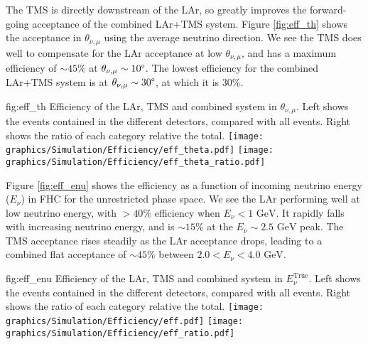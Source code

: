 The TMS is directly downstream of the LAr, so greatly improves the forward-going acceptance of the combined LAr+TMS system. Figure \ref{fig:eff_th} shows the acceptance in $\theta_{\nu,\mu}$ using the average neutrino direction. We see the TMS does well to compensate for the LAr acceptance at low $\theta_{\nu,\mu}$, and has a maximum efficiency of $\sim45\%$ at $\theta_{\nu,\mu}\sim10\degree$. The lowest efficiency for the combined LAr+TMS system is at $\theta_{\nu,\mu}\sim 30\degree$, at which it is 30\%.
\begin{dunefigure}[]{fig:eff_th}
{Efficiency of the LAr, TMS and combined system in $\theta_{\nu,\mu}$. Left shows the events contained in the different detectors, compared with all events. Right shows the ratio of each category relative the total.}
\texttt{[image: graphics/Simulation/Efficiency/eff\_theta.pdf]} \texttt{[image: graphics/Simulation/Efficiency/eff\_theta\_ratio.pdf]}
\end{dunefigure}

Figure \ref{fig:eff_enu} shows the efficiency as a function of incoming neutrino energy ($E_\nu$) in FHC for the unrestricted phase space. We see the LAr performing well at low neutrino energy, with $>40\%$ efficiency when $E_\nu < 1 \text{ GeV}$. It rapidly falls with increasing neutrino energy, and is $\sim15\%$ at the $E_\nu\sim 2.5\text{ GeV}$ peak. The TMS acceptance rises steadily as the LAr acceptance drops, leading to a combined flat acceptance of $\sim45\%$ between $2.0<E_\nu<4.0\text{ GeV}$.
\begin{dunefigure}[]{fig:eff_enu}
{Efficiency of the LAr, TMS and combined system in $E_\nu^\text{True}$. Left shows the events contained in the different detectors, compared with all events. Right shows the ratio of each category relative the total.}
\texttt{[image: graphics/Simulation/Efficiency/eff.pdf]} \texttt{[image: graphics/Simulation/Efficiency/eff\_ratio.pdf]}
\end{dunefigure}

